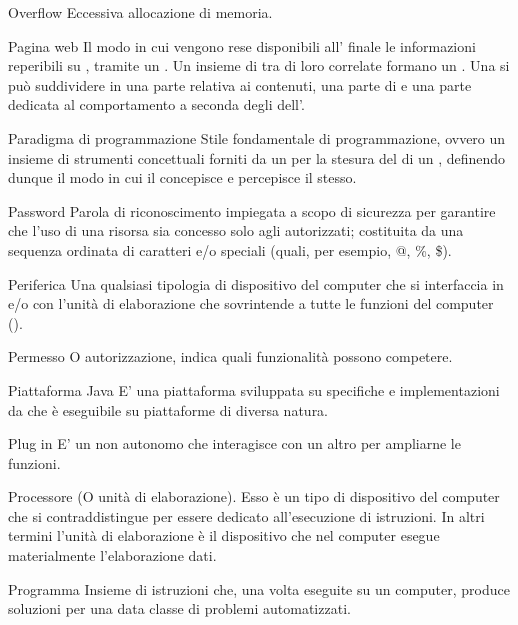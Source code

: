 \elemento
{Overflow}
{Eccessiva allocazione di memoria.}


\elemento
{Pagina web}
{Il modo in cui vengono rese disponibili all' finale le informazioni reperibili su , tramite un  . Un insieme di  tra di loro correlate formano un . Una  si può suddividere in una parte relativa ai contenuti, una parte di  e una parte dedicata al comportamento a seconda degli  dell'.
}

\elemento
{Paradigma di programmazione}
{Stile fondamentale di programmazione, ovvero un insieme di strumenti concettuali forniti da un  per la stesura del  di un , definendo dunque il modo in cui il  concepisce e percepisce il  stesso.}

\elemento
{Password}
{Parola di riconoscimento impiegata a scopo di sicurezza per garantire che l'uso di una risorsa sia concesso solo agli  autorizzati; costituita da una sequenza ordinata di caratteri  e/o speciali (quali, per esempio, @, \%, \$).}

\elemento
{Periferica}
{Una qualsiasi tipologia di dispositivo  del computer che si interfaccia in  e/o  con l'unità di elaborazione che sovrintende a tutte le funzioni del computer ().}

\elemento
{Permesso}
{O autorizzazione, indica quali funzionalità possono competere.}

\elemento
{Piattaforma Java}
{E' una piattaforma  sviluppata su specifiche e implementazioni da  che è eseguibile su piattaforme  di diversa natura.}

\elemento
{Plug in}
{E' un  non autonomo che interagisce con un altro  per ampliarne le funzioni.}

\elemento
{Processore}
{(O unità di elaborazione). Esso è un tipo di dispositivo  del computer che si contraddistingue per essere dedicato all'esecuzione di istruzioni. In altri termini l'unità di elaborazione è il dispositivo che nel computer esegue materialmente l'elaborazione dati.}

\elemento
{Programma}
{Insieme di istruzioni che, una volta eseguite su un computer, produce soluzioni per una data classe di problemi automatizzati.
}

